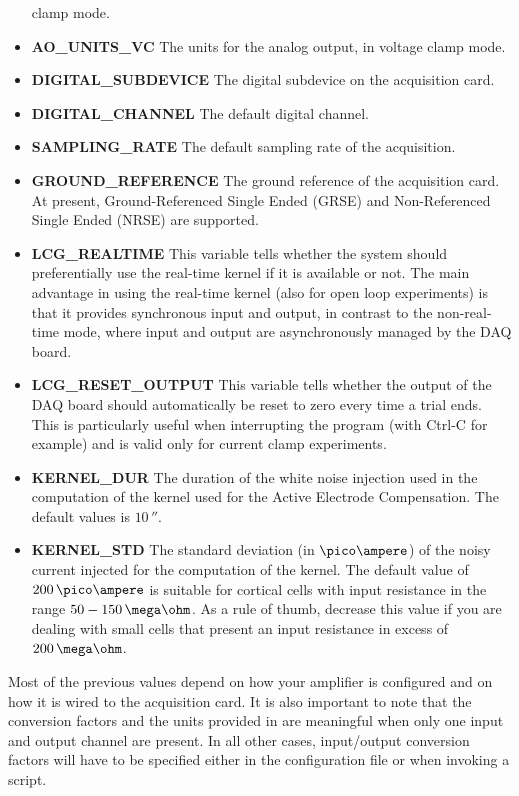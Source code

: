 \begin{itemize}
  clamp mode.
\item \textbf{AO\_UNITS\_VC} The units for the analog output, in voltage
  clamp mode.
\item \textbf{DIGITAL\_SUBDEVICE} The digital subdevice on the
  acquisition card.
\item \textbf{DIGITAL\_CHANNEL} The default digital channel.
\item \textbf{SAMPLING\_RATE} The default sampling rate of the acquisition.
\item \textbf{GROUND\_REFERENCE} The ground reference of the
  acquisition card. At present, Ground-Referenced Single Ended (GRSE)
  and Non-Referenced Single Ended (NRSE) are supported.
\item \textbf{LCG\_REALTIME} This variable tells whether the system
  should preferentially use the real-time kernel if it is available or
  not. The main advantage in using the real-time kernel (also for open
  loop experiments) is that it provides synchronous input and output,
  in contrast to the non-real-time mode, where input and output are
  asynchronously managed by the DAQ board.
\item \textbf{LCG\_RESET\_OUTPUT} This variable tells whether the
  output of the DAQ board should automatically be reset to zero every
  time a trial ends. This is particularly useful when interrupting the
  program (with Ctrl-C for example) and is valid only for current
  clamp experiments.
\item \textbf{KERNEL\_DUR} The duration of the white noise injection
  used in the computation of the kernel used for the Active Electrode
  Compensation. The default values is $10\,\second$.
\item \textbf{KERNEL\_STD} The standard deviation (in $\pico\ampere$)
  of the noisy current injected for the computation of the kernel. The
  default value of $200\,\pico\ampere$ is suitable for cortical
  cells with input resistance in the range
  $50-150\,\mega\ohm$. As a rule of thumb, decrease this value if you
  are dealing with small cells that present an input resistance in
  excess of $200\,\mega\ohm$.
\end{itemize}
Most of the previous values depend on how your amplifier is configured
and on how it is wired to the acquisition card. It is also important to
note that the conversion factors and the units provided in
 are meaningful when only one input and output
channel are present. In all other cases, input/output conversion
factors will have to be specified either in the configuration file or
when invoking a script.

